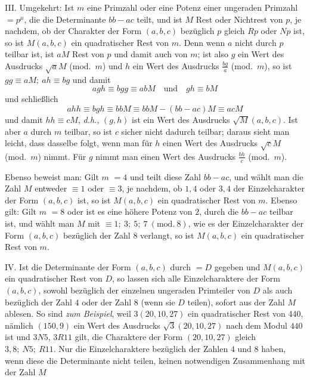 III. Umgekehrt: Ist $m$ eine Primzahl oder eine Potenz einer ungeraden Primzahl $=p^\mu$, die die Determinante $bb-ac$ teilt, und ist $M$ Rest oder Nichtrest von $p$, je nachdem, ob der Charakter der Form $(a,b,c)$ bezüglich $p$ gleich $Rp$ oder $Np$ ist, so ist $M(a,b,c)$ ein quadratischer Rest von $m$. Denn wenn $a$ nicht durch $p$ teilbar ist, ist $aM$ Rest von $p$ und damit auch von $m$; ist also $g$ ein Wert des Ausdrucks $\surd aM$ (mod.\ $m$) und $h$ ein Wert des Ausdrucks $\frac{bg}{a}$ (mod.\ $m$), so ist $gg\equiv aM;\ ah\equiv bg$ und damit
\[
agh\equiv bgg\equiv abM\quad\text{und}\quad gh\equiv bM
\]
und schließlich
\[
ahh\equiv bgh\equiv bbM\equiv bbM-(bb-ac)M\equiv acM
\]
und damit $hh\equiv cM$, \textit{d.h.}, $(g,h)$ ist ein Wert des Ausdrucks $\surd M(a,b,c)$. Ist aber $a$ durch $m$ teilbar, so ist $c$ sicher nicht dadurch teilbar; daraus sieht man leicht, dass dasselbe folgt, wenn man für $h$ einen Wert des Ausdrucks $\surd cM$ (mod.\ $m$) nimmt. Für $g$ nimmt man einen Wert des Ausdrucks $\frac{bh}{c}$ (mod.\ $m$).

Ebenso beweist man: Gilt $m$ $=4$ und teilt diese Zahl $bb-ac$, und wählt man die Zahl $M$ entweder $\equiv1$ oder $\equiv3$, je nachdem, ob $1,4$ oder $3,4$ der Einzelcharakter
der Form $(a,b,c)$ ist, so ist $M(a,b,c)$ ein quadratischer Rest von $m$. Ebenso gilt: Gilt $m$ $=8$ oder ist es eine höhere Potenz von $2$, durch die $bb-ac$ teilbar ist, und wählt man $M$ mit $\equiv1;\ 3;\ 5;\ 7\ (\mathrm{mod.}\ 8)$, wie es der Einzelcharakter der Form $(a,b,c)$ bezüglich der Zahl $8$ verlangt, so ist $M(a,b,c)$ ein quadratischer Rest von $m$.

IV. Ist die Determinante der Form $(a,b,c)$ durch $=D$ gegeben und $M(a,b,c)$ ein quadratischer Rest von $D$, so lassen sich alle Einzelcharaktere der Form $(a,b,c)$, sowohl bezüglich der einzelnen ungeraden Primteiler von $D$ als auch bezüglich der Zahl $4$ oder der Zahl $8$ (wenn sie $D$ teilen), sofort aus der Zahl $M$ ablesen. So sind \textit{zum Beispiel}, weil $3(20,10,27)$ ein quadratischer Rest von $440$, nämlich $(150,9)$ ein Wert des Ausdrucks $\surd3(20,10,27)$ nach dem Modul $440$ ist und $3N5$, $3R11$ gilt, die Charaktere der Form $(20,10,27)$ gleich $3,8;\ N5;\ R11$. Nur die Einzelcharaktere bezüglich der Zahlen $4$ und $8$ haben, wenn diese die Determinante nicht teilen, keinen notwendigen Zusammenhang mit der Zahl $M$

